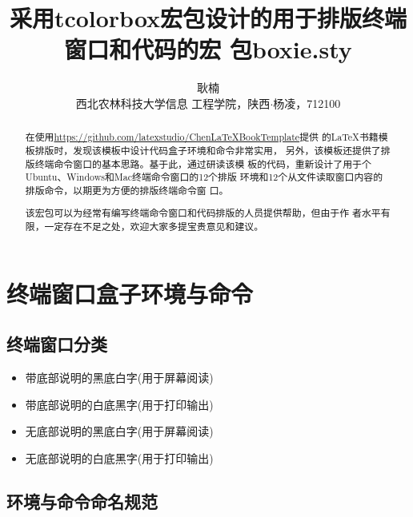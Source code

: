 \documentclass{ctexart}
\title{\Large \heiti 采用tcolorbox宏包设计的用于排版终端窗口和代码的宏
  包boxie.sty}
\author{\zihao{4} \fangsong 耿楠\\\small \songti 西北农林科技大学信息
  工程学院，陕西$\cdot$杨凌，712100}
\begin{document}

\maketitle

\begin{abstract}
  在使用\url{https://github.com/latexstudio/ChenLaTeXBookTemplate}提供
  的\LaTeX 书籍模板排版时，发现该模板中设计代码盒子环境和命令非常实用，
  另外，该模板还提供了排版终端命令窗口的基本思路。基于此，通过研读该模
  板的代码，重新设计了用于个Ubuntu、Windows和Mac终端命令窗口的12个排版
  环境和12个从文件读取窗口内容的排版命令，以期更为方便的排版终端命令窗
  口。

  该宏包可以为经常有编写终端命令窗口和代码排版的人员提供帮助，但由于作
  者水平有限，一定存在不足之处，欢迎大家多提宝贵意见和建议。
\end{abstract}

\section{终端窗口盒子环境与命令}
\subsection{终端窗口分类}
\begin{itemize}
\item 带底部说明的黑底白字(用于屏幕阅读)
\item 带底部说明的白底黑字(用于打印输出)
\item 无底部说明的黑底白字(用于屏幕阅读)
\item 无底部说明的白底黑字(用于打印输出)
\end{itemize}

\subsection{环境与命令命名规范}
\end{document}
